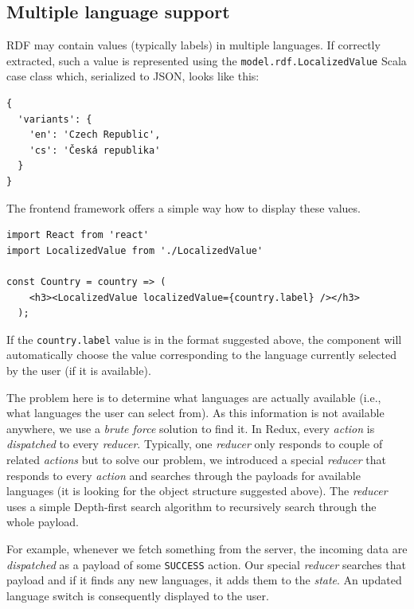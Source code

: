 \subsection{Multiple language support}
\label{sec:implementation:advanced-features:multiple-language-support}


RDF may contain values (typically labels) in multiple languages. If correctly extracted, such a value is represented using the \texttt{model.rdf.LocalizedValue} Scala case class which, serialized to JSON, looks like this:

\begin{verbatim}
{
  'variants': {
    'en': 'Czech Republic',
    'cs': 'Česká republika'
  }
}
\end{verbatim}

The frontend framework offers a simple way how to display these values.

\begin{verbatim}
import React from 'react'
import LocalizedValue from './LocalizedValue'

const Country = country => (
    <h3><LocalizedValue localizedValue={country.label} /></h3>
  );
\end{verbatim}

If the \texttt{country.label} value is in the format suggested above, the component will automatically choose the value corresponding to the language currently selected by the user (if it is available).

The problem here is to determine what languages are actually available (i.e., what languages the user can select from). As this information is not available anywhere, we use a \emph{brute force} solution to find it. In Redux, every \emph{action} is \emph{dispatched} to every \emph{reducer}. Typically, one \emph{reducer} only responds to couple of related \emph{actions} but to solve our problem, we introduced a special \emph{reducer} that responds to every \emph{action} and searches through the payloads for available languages (it is looking for the object structure suggested above). The \emph{reducer} uses a simple Depth-first search algorithm to recursively search through the whole payload.

For example, whenever we fetch something from the server, the incoming data are \emph{dispatched} as a payload of some \texttt{SUCCESS} action. Our special \emph{reducer} searches that payload and if it finds any new languages, it adds them to the \emph{state}. An updated language switch is consequently displayed to the user.

